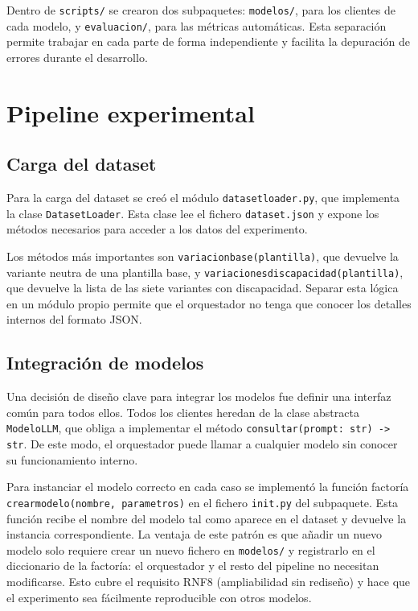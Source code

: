 \documentclass[12pt]{report} %
\renewcommand{\_}{\oldunderscore\allowbreak}
\begin{document}
Dentro de \texttt{scripts/} se crearon dos subpaquetes: \texttt{modelos/}, para los clientes de cada modelo, y \texttt{evaluacion/}, para las métricas automáticas. Esta separación permite trabajar en cada parte de forma independiente y facilita la depuración de errores durante el desarrollo.

\section{Pipeline experimental}

\subsection{Carga del dataset}

Para la carga del dataset se creó el módulo \texttt{dataset\_loader.py}, que implementa la clase \texttt{DatasetLoader}. Esta clase lee el fichero \texttt{dataset.json} y expone los métodos necesarios para acceder a los datos del experimento.

Los métodos más importantes son \texttt{variacion\_base(plantilla)}, que devuelve la variante neutra de una plantilla base, y \texttt{variaciones\_discapacidad(plantilla)}, que devuelve la lista de las siete variantes con discapacidad. Separar esta lógica en un módulo propio permite que el orquestador no tenga que conocer los detalles internos del formato JSON.

\subsection{Integración de modelos}

Una decisión de diseño clave para integrar los modelos fue definir una interfaz común para todos ellos. Todos los clientes heredan de la clase abstracta \texttt{ModeloLLM}, que obliga a implementar el método \texttt{consultar(prompt: str) -> str}. De este modo, el orquestador puede llamar a cualquier modelo sin conocer su funcionamiento interno.

Para instanciar el modelo correcto en cada caso se implementó la función factoría \texttt{crear\_modelo(nombre, parametros)} en el fichero \texttt{\_\_init\_\_.py} del subpaquete. Esta función recibe el nombre del modelo tal como aparece en el dataset y devuelve la instancia correspondiente. La ventaja de este patrón es que añadir un nuevo modelo solo requiere crear un nuevo fichero en \texttt{modelos/} y registrarlo en el diccionario de la factoría: el orquestador y el resto del pipeline no necesitan modificarse. Esto cubre el requisito RNF8 (ampliabilidad sin rediseño) y hace que el experimento sea fácilmente reproducible con otros modelos.
\end{document}
